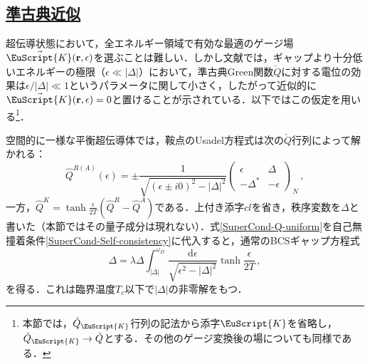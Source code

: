 \documentclass[a4paper,11pt]{ltjsarticle}
\newcommand{\subsectionlink}[1]{\subsection[#1]{\hyperlink{toc}{#1}}}
\def\d{\mathrm{d}}
\begin{document}
\subsectionlink{準古典近似}\label{sec_SuperCond-2}

超伝導状態において，全エネルギー領域で有効な最適のゲージ場$\vec{\EuScript{K}}(\mathbf{r},\epsilon)$を選ぶことは難しい．しかし文献\cite{NarozhnyAleiner}では，ギャップより十分低いエネルギーの極限（$\epsilon\ll|\Delta|$）において，準古典Green関数$\check{Q}$に対する電位の効果は$\epsilon/|\Delta|\ll1$というパラメータに関して小さく，したがって近似的に$\vec{\EuScript{K}}(\mathbf{r},\epsilon)=0$と置けることが示されている．以下ではこの仮定を用いる\footnote{本節では，$\check{Q}_{\EuScript{K}}$行列の記法から添字$\EuScript{K}$を省略し，$\check{Q}_{\EuScript{K}}\to\check{Q}$とする．その他のゲージ変換後の場についても同様である．}．

空間的に一様な平衡超伝導体では，鞍点のUsadel方程式は次の$\check{Q}$行列によって解かれる：
\begin{equation}\label{SuperCond-Q-uniform}
\hat{Q}^{R(A)}(\epsilon)=\pm\frac{1}{\sqrt{(\epsilon\pm
i0)^{2}-|\Delta|^{2}}}\left(\begin{array}{cc}\epsilon &\Delta
\\ -\Delta^{*} & -\epsilon\end{array}\right)_N\,,
\end{equation}
一方，$\hat Q^K=\tanh\frac{\epsilon}{2T}(\hat Q^R-\hat Q^A)$である．上付き添字$cl$を省き，秩序変数を$\Delta$と書いた（本節ではその量子成分は現れない）．式\eqref{SuperCond-Q-uniform}を自己無撞着条件\eqref{SuperCond-Self-consistency}に代入すると，通常のBCSギャップ方程式
\begin{equation}\label{SuperCond-BCS-gap}
\Delta=\lambda\Delta\int^{\omega_{D}}_{|\Delta|}\frac{\d\epsilon}
{\sqrt{\epsilon^{2}-|\Delta|^{2}}}\tanh\frac{\epsilon}{2T}\,,
\end{equation}
を得る．これは臨界温度$T_{c}$以下で$|\Delta|$の非零解をもつ．
\end{document}

